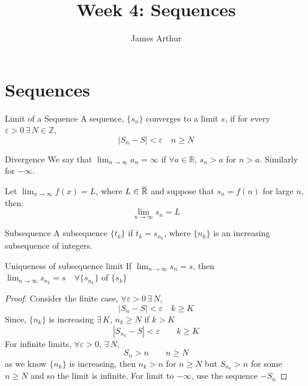 \documentclass{article}
\title{Week 4: Sequences}
\author{James Arthur}
\newcommand{\R}{\mathbb{R}}
\newcommand{\Z}{\mathbb{Z}}
\newcommand{\e}{\varepsilon}
\newcommand{\ex}{\exists\,}
\newcommand{\overbar}[1]{\mkern 1.5mu\overline{\mkern-1.5mu#1\mkern-1.5mu}\mkern 1.5mu}
\newcommand{\eR}{\overbar{\R}}
\begin{document}
\maketitle
\tableofcontents
\newpage

\section{Sequences}

\noindent\begin{definition}{Limit of a Sequence}{}
  A sequence, $\{s_n \}$ converges to a limit $s$, if for every $\e > 0\, \ex N\in \Z$,
  $$ |S_n - S|< \e \quad n \ge N $$
\end{definition}\vspace{10pt}

\noindent\begin{definition}{Divergence}{}
  We say that $\displaystyle{\lim_{n\to\infty}{a_n} = \infty}$ if $\forall a \in \R$, $s_n > a$ for $n > a$. Similarly for $-\infty$.
\end{definition}\vspace{10pt}

\noindent\begin{theorem}{}{}
   Let $\displaystyle{\lim_{x\to \infty}{f(x)} = L}$, where $L\in \eR$ and suppose that $s_n = f(n)$ for large $n$, then:
   $$ \lim_{n\to\infty}{s_n} = L $$
\end{theorem}\vspace{10pt}

\noindent\begin{definition}{Subsequence}{}
  A subsequence $\{ t_k \}$ if $t_k = s_{n_k}$, where $\{ n_k \}$ is an increasing subsequence of integers.
\end{definition}\vspace{10pt}

\noindent\begin{theorem}{Uniqueness of subsequence limit}{}
   If $\displaystyle{\lim_{n\to\infty}{s_n} = s}$, then $\displaystyle{\lim_{n\to\infty}{s_{n_k}} = s \quad\forall \{s_{n_k} \}}$  of $\{ s_k \}$
\end{theorem}\vspace{10pt}
\begin{proof}
  Consider the finite case, $\forall \e > 0\,\ex N$,
  $$ |S_n - S| < \e \quad k \ge K$$
  Since, $\{ n_k \}$ is increasing $\ex K$, $n_k \ge N$ if $k > K$
  $$ |S_{n_k} - S|<\e \qquad k \ge K $$
  For infinite limits, $\forall \e >0, \, \ex N$,
  $$ S_n > n \qquad n \ge N $$
  as we know $\displaystyle{\{ n_k \}}$ is increasing, then $n_k > n$ for $n \ge N$ but $S_{n_k} > n$ for some $n \ge N$ and so the limit is infinite. For limit to $-\infty$, use the sequence $-S_n$
\end{proof}
\end{document}
